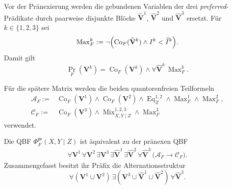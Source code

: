 Vor der Pränexierung werden die gebundenen Variablen der drei
\emph{preferred}-Prädikate durch paarweise disjunkte Blöcke
\(\widehat{\mathbf V}^{1}\),
\(\widehat{\mathbf V}^{2}\) und
\(\widehat{\mathbf V}^{3}\) ersetzt. Für \(k\in\{1,2,3\}\) sei
\[
\operatorname{Max}_F^k
:=
\neg\Bigl(
    \operatorname{Co}_F(\widehat{\mathbf V}^{k})
    \land
    I^k<\widehat{I}^{k}
\Bigr).
\]
Damit gilt
\[
\operatorname{Pr}_F(\mathbf V^k)
=
\operatorname{Co}_F(\mathbf V^k)
\land
\forall\widehat{\mathbf V}^{k}\,
\operatorname{Max}_F^k.
\]

Für die spätere Matrix werden die beiden quantorenfreien Teilformeln
\[
\begin{aligned}
\mathcal A_F
:={}&
    \operatorname{Co}_F(\mathbf V^1)
    \land
    \operatorname{Co}_F(\mathbf V^2)
    \land
    \operatorname{Eq}^{1,2}_Z
    \land
    \operatorname{Max}_F^1
    \land
    \operatorname{Max}_F^2,
\\
\mathcal C_F
:={}&
    \operatorname{Co}_F(\mathbf V^3)
    \land
    \operatorname{Mix}^{1,2,3}_{X,Y\mid Z}
    \land
    \operatorname{Max}_F^3
\end{aligned}
\]
verwendet.

\begin{Proposition}
\label{prop:preferred-prenex-equivalent}
Die QBF \(\Phi_F^{\mathsf{pr}}(X,Y\mid Z)\) ist äquivalent zu der
pränexen QBF
\[
\begin{split}
\forall\mathbf V^1\,
\forall\mathbf V^2\,
\exists\mathbf V^3\,
\exists\widehat{\mathbf V}^{1}\,
\exists\widehat{\mathbf V}^{2}\,
\forall\widehat{\mathbf V}^{3}\,
\bigl(
    \mathcal A_F\rightarrow\mathcal C_F
\bigr).
\end{split}
\]
Zusammengefasst besitzt ihr Präfix die Alternationsstruktur
\[
\forall(\mathbf V^1\cup\mathbf V^2)\,
\exists(\mathbf V^3\cup
        \widehat{\mathbf V}^{1}\cup
        \widehat{\mathbf V}^{2})\,
\forall\widehat{\mathbf V}^{3}.
\]
\end{Proposition}

